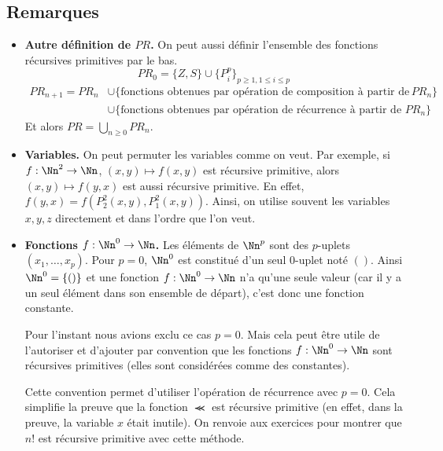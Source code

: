 \documentclass[11pt,class=report,crop=false]{standalone}
\begin{document}
\subsection{Remarques} 

\begin{itemize}
    \item \textbf{Autre définition de $PR$.} On peut aussi définir l'ensemble des fonctions récursives primitives \og{}par le bas\fg{}.
\[ PR_0 = \{Z, S\} \cup \{P_i^p\}_{p \ge 1, 1 \le i \le p} \]
\begin{equation*}
\begin{split}
PR_{n+1} = PR_n &\cup \{ \text{fonctions obtenues par opération de composition à partir de } PR_n \} \\
&\cup \{ \text{fonctions obtenues par opération de récurrence à partir de } PR_n \}
\end{split}
\end{equation*}
Et alors $PR = \bigcup_{n \ge 0} PR_n$.

    \item \textbf{Variables.} On peut permuter les variables comme on veut. 
Par exemple, si $f : \Nn^2 \to \Nn$, $(x,y) \mapsto f(x,y)$ est récursive primitive, alors $(x,y) \mapsto f(y,x)$ est aussi récursive primitive. 
En effet, $f(y,x) = f(P_2^2(x,y), P_1^2(x,y))$. 
Ainsi, on utilise souvent les variables $x, y, z$ directement et dans l'ordre que l'on veut.

    \item \textbf{Fonctions $f : \Nn^0 \to \Nn$.}
Les éléments de $\Nn^p$ sont des $p$-uplets $(x_1, \dots, x_p)$. 
Pour $p=0$, $\Nn^0$ est constitué d'un seul $0$-uplet noté $()$. Ainsi $\Nn^0 = \{()\}$ et une fonction $f : \Nn^0 \to \Nn$ n'a qu'une seule valeur (car il y a un seul élément dans son ensemble de départ), c'est donc une fonction constante.

Pour l'instant nous avions exclu ce cas $p=0$. 
Mais cela peut être utile de l'autoriser et d'ajouter par convention que les fonctions $f : \Nn^0 \to \Nn$ sont récursives primitives (elles sont considérées comme des constantes). 

Cette convention permet d'utiliser l'opération de récurrence avec $p=0$. 
Cela simplifie la preuve que la fonction $\Prec$ est récursive primitive (en effet, dans la preuve, la variable $x$ était inutile).
On renvoie aux exercices pour montrer que $n!$ est récursive primitive avec cette méthode.
\end{itemize}
\end{document}

